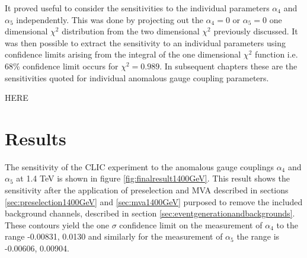 It proved useful to consider the sensitivities to the individual parameters $\alpha_{4}$ and $\alpha_{5}$ independently.  This was done by projecting out the $\alpha_{4} = 0$ or $\alpha_{5} = 0$ one dimensional $\chi^{2}$ distribution from the two dimensional $\chi^{2}$ previously discussed.  It was then possible to extract the sensitivity to an individual parameters using confidence limits arising from the integral of the one dimensional $\chi^{2}$ function i.e. 68\% confidence limit occurs for $\chi^{2} = 0.989$.  In subsequent chapters these are the sensitivities quoted for individual anomalous gauge coupling parameters. 

HERE

\section{Results}
The sensitivity of the CLIC experiment to the anomalous gauge couplings $\alpha_{4}$ and $\alpha_{5}$ at 1.4 TeV is shown in figure \ref{fig:finalresult1400GeV}.  This result shows the sensitivity after the application of preselection and MVA described in sections \ref{sec:preselection1400GeV} and \ref{sec:mva1400GeV} purposed to remove the included background channels, described in section \ref{sec:eventgenerationandbackgrounds}.  These contours yield the one $\sigma$ confidence limit on the measurement of $\alpha_{4}$ to the range -0.00831, 0.0130 and similarly for the measurement of $\alpha_{5}$ the range is -0.00606, 0.00904.

